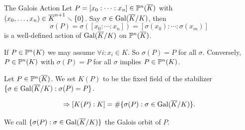 \documentclass{beamer}
\begin{document}
\begin{frame}{The Galois Action}
  Let
  $P=[x_0:\cdots:x_n]\in {\mathbb{P}}^n(\overline{K})$ with  $(x_0,\ldots,x_n) \in
  \overline{K}^{n+1}\smallsetminus\{0\}$.
  Say $\sigma\in \mathrm{Gal}(\overline{K}/K)$, then
  \begin{equation*}
    \sigma(P)=  \sigma([x_0:\cdots:x_n]) = [\sigma(x_0):\cdots:\sigma(x_m)]
  \end{equation*}
  is a well-defined action of $\mathrm{Gal}(\overline{K}/K)$ on ${\mathbb{P}}^n(\overline K)$.

  If $P\in {\mathbb{P}}^n(K)$ we may assume $\forall i:x_i\in K$. So
  $\sigma(P)=P$ for all $\sigma$.
  Conversely, 
  $P\in {\mathbb{P}}^n(K)$ with $\sigma(P)=P$ for all $\sigma$ implies
  $P\in {\mathbb{P}}^n(K)$.

  \begin{definition}
    Let $P\in {\mathbb{P}}^n(\overline K)$. 
    We set $K(P)$ to be the fixed field of the stabilizer
    $\{\sigma\in \mathrm{Gal}(\overline{K}/K) : \sigma(P)=P\}$. 
  \end{definition}


  \begin{equation*}
    \Rightarrow [K(P):K]  = \#\{\sigma(P) : \sigma\in\mathrm{Gal}(\overline{K}/K) \}. 
  \end{equation*}

  We call $\{\sigma(P) : \sigma\in \mathrm{Gal}(\overline{K}/K)\}$ the \alert{Galois
    orbit} of $P$. 
\end{frame}
\end{document}
